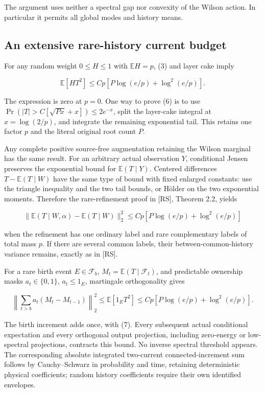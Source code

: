 \documentclass[
  11pt,
]{article}
\begin{document}
The argument uses neither a spectral gap nor convexity of the Wilson
action. In particular it permits all global modes and history means.

\hypertarget{an-extensive-rare-history-current-budget}{%
\subsection{An extensive rare-history current
budget}\label{an-extensive-rare-history-current-budget}}

For any random weight \(0\le H\le1\) with \(\mathbb EH=p\), (3) and
layer cake imply

\[
 \boxed{\quad
 \mathbb E[H T^2]
 \le C p\left[P\log(e/p)+\log^2(e/p)\right].
 \quad} \tag{6}
\]

The expression is zero at \(p=0\). One way to prove (6) is to use
\(\Pr(|T|>C[\sqrt{Px}+x])\le2e^{-x}\), split the layer-cake integral at
\(x=\log(2/p)\), and integrate the remaining exponential tail. This
retains one factor \(p\) and the literal original root count \(P\).

Any complete positive source-free augmentation retaining the Wilson
marginal has the same result. For an arbitrary actual observation \(Y\),
conditional Jensen preserves the exponential bound for
\(\mathbb E(T\mid Y)\). Centered differences \(T-\mathbb E(T\mid W)\)
have the same type of bound with fixed enlarged constants: use the
triangle inequality and the two tail bounds, or Hölder on the two
exponential moments. Therefore the rare-refinement proof in [RS],
Theorem 2.2, yields

\[
 \|\mathbb E(T\mid W,\alpha)-\mathbb E(T\mid W)\|_2^2
 \le Cp\left[P\log(e/p)+\log^2(e/p)\right] \tag{7}
\]

when the refinement has one ordinary label and rare complementary labels
of total mass \(p\). If there are several common labels, their
between-common-history variance remains, exactly as in [RS].

For a rare birth event \(E\in\mathcal F_b\),
\(M_t=\mathbb E(T\mid\mathcal F_t)\), and predictable ownership masks
\(a_t\in\{0,1\}\), \(a_t\le1_E\), martingale orthogonality gives

\[
 \left\|\sum_{t>b}a_t(M_t-M_{t-1})\right\|_2^2
 \le\mathbb E[1_ET^2]
 \le Cp\left[P\log(e/p)+\log^2(e/p)\right]. \tag{8}
\]

The birth increment adds once, with (7). Every subsequent actual
conditional expectation and every orthogonal output projection,
including zero-energy or low-spectral projections, contracts this bound.
No inverse spectral threshold appears. The corresponding absolute
integrated two-current connected-increment sum follows by
Cauchy--Schwarz in probability and time, retaining deterministic
physical coefficients; random history coefficients require their own
identified envelopes.
\end{document}
